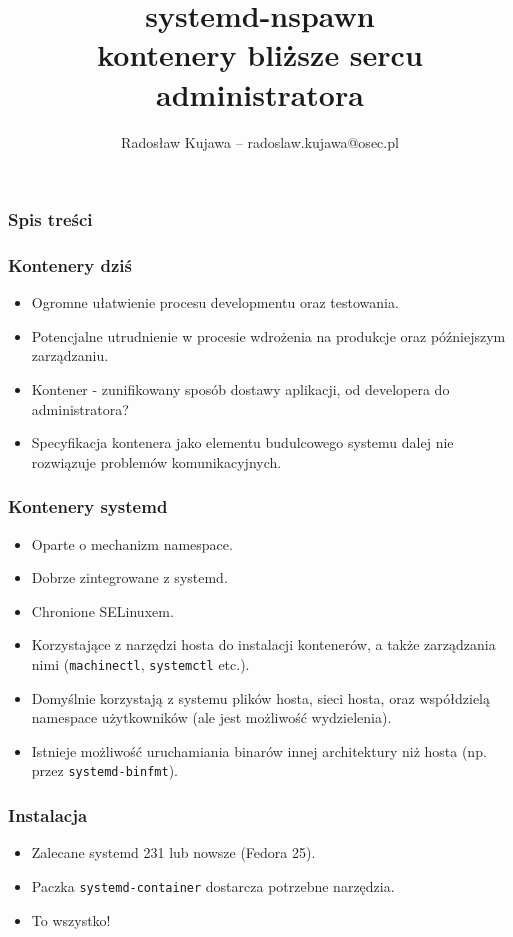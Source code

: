\documentclass[dvipsnames,table]{beamer}
\title{systemd-nspawn \\ kontenery bliższe sercu administratora}
\author{Radosław Kujawa -- radoslaw.kujawa@osec.pl}
\institute{OSEC}
\begin{document}
\begin{frame}
	\titlepage
\end{frame}

\begin{frame}[allowframebreaks]
	\frametitle{Spis treści}
	{
		\hypersetup{colorlinks=true,linkcolor=black,urlcolor=OSEC-red}
		\tableofcontents
	}
\end{frame}


\begin{frame}
\frametitle{Kontenery dziś}
\begin{itemize}
	\item Ogromne ułatwienie procesu developmentu oraz testowania.
	\item Potencjalne utrudnienie w procesie wdrożenia na produkcje oraz późniejszym zarządzaniu.
	\item Kontener - zunifikowany sposób dostawy aplikacji, od developera do administratora?
	\item Specyfikacja kontenera jako elementu budulcowego systemu dalej nie rozwiązuje problemów komunikacyjnych. 
\end{itemize}
\end{frame}

\begin{frame}
\frametitle{Kontenery systemd}
\begin{itemize}
	\item Oparte o mechanizm namespace.
	\item Dobrze zintegrowane z systemd.
	\item Chronione SELinuxem.
	\item Korzystające z narzędzi hosta do instalacji kontenerów, a także zarządzania nimi ({\tt machinectl}, {\tt systemctl} etc.).
	\item Domyślnie korzystają z systemu plików hosta, sieci hosta, oraz współdzielą namespace użytkowników (ale jest możliwość wydzielenia).
	\item Istnieje możliwość uruchamiania binarów innej architektury niż hosta (np. przez {\tt systemd-binfmt}).
\end{itemize}
\end{frame}

\begin{frame}
\frametitle{Instalacja}
\begin{itemize}
	\item Zalecane systemd 231 lub nowsze (Fedora 25).
	\item Paczka {\tt systemd-container} dostarcza potrzebne narzędzia.
	\item To wszystko! \Smiley
\end{itemize}
\end{frame}
\end{document}
